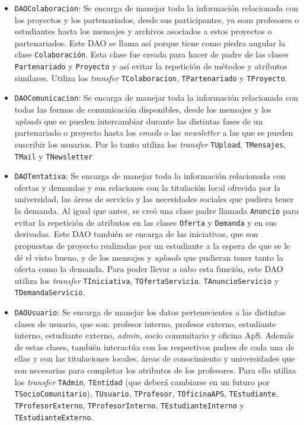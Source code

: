 \documentclass[11pt]{book}
\begin{document}
\begin{itemize}
	\item \texttt{DAOColaboracion}: Se encarga de manejar toda la información relacionada con los proyectos y los partenariados, desde sus participantes, ya sean profesores o estudiantes hasta los mensajes y archivos asociados a estos proyectos o partenariados. Este DAO se llama así porque tiene como piedra angular la clase \texttt{Colaboración}.
	Esta clase fue creada para hacer de padre de las clases \texttt{Partenariado} y \texttt{Proyecto} y así evitar la repetición de métodos y atributos similares. Utiliza los \emph{transfer} \texttt{TColaboracion}, \texttt{TPartenariado} y \texttt{TProyecto}.

	\item \texttt{DAOComunicacion}: Se encarga de manejar toda la información relacionada con todas las formas de comunicación disponibles, desde los mensajes y los \emph{uploads} que se pueden intercambiar durante las distintas fases de un partenariado o proyecto hasta los \emph{emails} o las \emph{newsletter} a las que se pueden suscribir los usuarios. Por lo tanto utiliza los \emph{transfer} \texttt{TUpload}, \texttt{TMensajes}, \texttt{TMail} y \texttt{TNewsletter}

	\item \texttt{DAOTentativa}: Se encarga de manejar toda la información relacionada con ofertas y demandas y sus relaciones con la titulación local ofrecida por la universidad, las áreas de servicio y las necesidades sociales que pudiera tener la demanda. 
	Al igual que antes, se creó una clase padre llamada \texttt{Anuncio} para evitar la repetición de atributos en las clases \texttt{Oferta} y \texttt{Demanda} y en sus derivadas. Este DAO también se encarga de las iniciativas, que son propuestas de proyecto realizadas por un estudiante a la espera de que se le dé el visto bueno, y de los mensajes y \emph{uploads} que pudieran tener tanto la oferta como la demanda. Para poder llevar a cabo esta función, este DAO utiliza los \emph{transfer} \texttt{TIniciativa}, \texttt{TOfertaServicio}, \texttt{TAnuncioServicio} y \texttt{TDemandaServicio}.

	\item \texttt{DAOUsuario}: Se encarga de manejar los datos pertenecientes a las distintas clases de usuario, que son: profesor interno, profesor externo, estudiante interno, estudiante externo, \emph{admin}, socio comunitario y oficina ApS.
	Además de estas clases, también interactúa con los respectivos padres de cada una de ellas y con las titulaciones locales, áreas de conocimiento y universidades que son necesarias para completar los atributos de los profesores.
	Para ello utiliza los \emph{transfer} \texttt{TAdmin}, \texttt{TEntidad} (que deberá cambiarse en un futuro por \texttt{TSocioComunitario}), \texttt{TUsuario}, \texttt{TProfesor}, \texttt{TOficinaAPS}, \texttt{TEstudiante}, \texttt{TProfesorExterno}, \texttt{TProfesorInterno}, \texttt{TEstudianteInterno} y \texttt{TEstudianteExterno}.

	
	\end{itemize}
\end{document}
